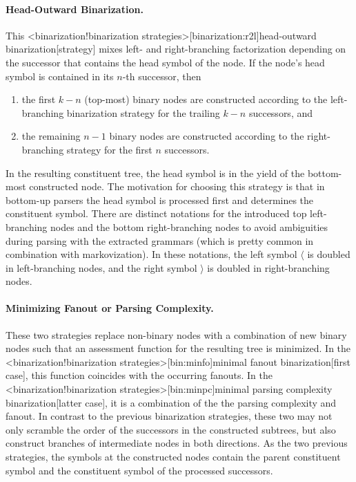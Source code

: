 \documentclass[../document.tex]{subfiles}
\begin{document}
    \paragraph{Head-Outward Binarization.}
    This <binarization!binarization strategies>[binarization:r2l]{head-outward binarization}[strategy] mixes left- and right-branching factorization depending on the successor that contains the head symbol of the node.
    If the node's head symbol is contained in its \(n\)-th successor, then
    \begin{enumerate}
        \item the first \(k-n\) (top-most) binary nodes are constructed according to the left-branching binarization strategy for the trailing \(k-n\) successors, and
        \item the remaining \(n-1\) binary nodes are constructed according to the right-branching strategy for the first \(n\) successors.
    \end{enumerate}
    In the resulting constituent tree, the head symbol is in the yield of the bottom-most constructed node.
    The motivation for choosing this strategy is that in bottom-up parsers the head symbol is processed first and determines the constituent symbol.
    There are distinct notations for the introduced top left-branching nodes and the bottom right-branching nodes to avoid ambiguities during parsing with the extracted grammars (which is pretty common in combination with markovization).
    In these notations, the left symbol \(\langle\) is doubled in left-branching nodes, and the right symbol \(\rangle\) is doubled in right-branching nodes.

    \paragraph{Minimizing Fanout or Parsing Complexity.}
    These two strategies replace non-binary nodes with a combination of new binary nodes such that an assessment function for the resulting tree is minimized.
    In the <binarization!binarization strategies>[bin:minfo]{minimal fanout binarization}[first case], this function coincides with the occurring fanouts.
    In the <binarization!binarization strategies>[bin:minpc]{minimal parsing complexity binarization}[latter case], it is a combination of the the parsing complexity and fanout.
    In contrast to the previous binarization strategies, these two may not only scramble the order of the successors in the constructed subtrees, but also construct branches of intermediate nodes in both directions.
    As the two previous strategies, the symbols at the constructed nodes contain the parent constituent symbol and the constituent symbol of the processed successors.
\end{document}
